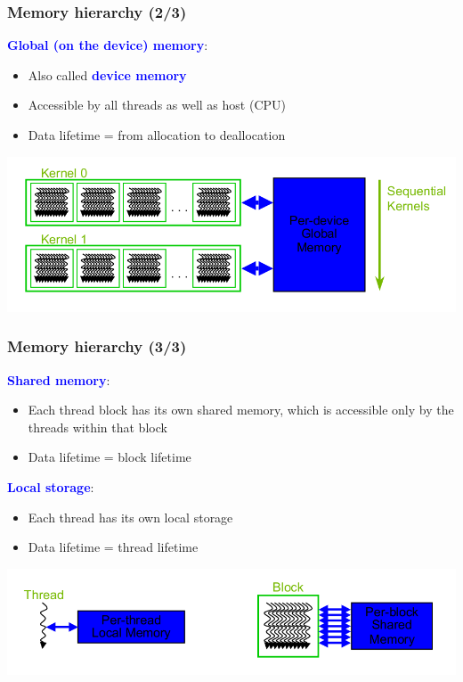 \begin{frame}[fragile]
\frametitle{Memory hierarchy (2/3)}

\textcolor{blue}{\bf Global (on the device) memory}:
\begin{itemize}
\item Also called \textcolor{blue}{\bf device memory}
\item Accessible by all threads as well as host (CPU)
\item Data lifetime = from allocation to deallocation
\end{itemize}


\begin{center}
\includegraphics[scale=0.5]{images/14.png}
\end{center}
\end{frame}
\begin{frame}[fragile]
\frametitle{Memory hierarchy (3/3)}

\textcolor{blue}{\bf Shared memory}:
\begin{itemize}
\item  Each thread block has its own shared memory,
       which is accessible only by the threads within that block
\item Data lifetime = block lifetime
\end{itemize}

\textcolor{blue}{\bf Local storage}:
\begin{itemize}
\item Each thread has its own local storage
\item Data lifetime = thread lifetime
\end{itemize}

\begin{center}
\includegraphics[scale=0.5]{images/13.png}
\end{center}
\end{frame}
